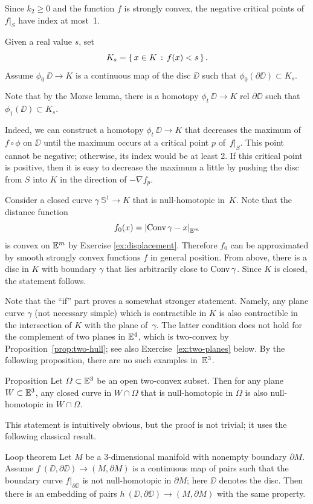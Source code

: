Since $k_2\ge 0$ and the function $f$ is  strongly
 convex, 
the negative critical points of $f|_S$
have index at most~1.

Given a real value $s$, set 
\[K_s=\left\{\,{x\in K}\,:\,{f(x)<s}\,\right\}.\]
Assume  $\phi_0\:\DD\to K$ is a continuous map of the disc $\DD$
such that $\phi_0(\partial \DD)\subset K_s$.

Note that by the Morse lemma, 
there is a homotopy $\phi_t\:\DD\to K$ rel $\partial \DD$ such that 
$\phi_1(\DD)\subset K_s$.

Indeed, we can construct a homotopy $\phi_t\:\DD\to K$ that decreases the maximum of $f\circ\phi$ on $\DD$ until the maximum occurs at a critical point $p$ of~$f|_S$.
This point cannot be negative; otherwise, its index would be at least 2.
If this critical point is positive, then it is easy to decrease the maximum a little by pushing the disc from $S$ into $K$ in the direction of $-\nabla f_p$.

Consider a closed curve $\gamma\:\mathbb{S}^1\to K$ that is null-homotopic in~$K$.
Note that the distance function \[f_0(x)\z=\dist{\Conv\gamma}{x}{\EE^m}\] 
is convex on $\mathbb{E}^m$ by Exercise \ref{ex:displacement}.
Therefore $f_0$ can be approximated by smooth strongly convex functions $f$ in general position.
From above, there is a disc in $K$ with boundary $\gamma$
that lies arbitrarily close to $\mathop{\rm Conv}\nolimits\gamma$.
Since $K$ is closed, the statement follows.
\qeds

Note that the ``if'' part proves a somewhat stronger statement.
Namely,  any plane curve $\gamma$ (not necessary simple) which is  contractible in $K$ is also contractible in the intersection of $K$ with the plane of~$\gamma$.
The latter condition does not hold for the complement 
of two planes in $\mathbb{E}^4$, which is two-convex by Proposition~\ref{prop:two-hull};
see also Exercise~\ref{ex:two-planes} below.
By the following proposition, there are no such examples in~$\mathbb{E}^3$.

\begin{thm}{Proposition}\label{prop:3d-strong-2-convexity}
Let $\varOmega\subset\mathbb{E}^3$ be an open two-convex subset.
Then for any plane $W\subset\mathbb{E}^3$, 
any closed curve in $W\cap \Omega$ 
that is null-homotopic in $\Omega$ is also null-homotopic in $W\cap \Omega$.
\end{thm}

This statement is intuitively obvious, but the proof is not trivial;
it uses the following classical result.

\begin{thm}{Loop theorem}
Let $M$ be a 3-dimensional manifold with nonempty boundary $\partial M$.
Assume 
$f\: (\DD,\partial \DD)\to (M,\partial M)$
is a continuous map of pairs
such that the boundary curve $f|_{\partial \DD}$ is not null-homotopic in $\partial M$; here $\DD$ denotes the disc.
Then there is an embedding of pairs $h\: (\DD,\partial \DD)\to (M,\partial M)$ with the same property.
\end{thm}

